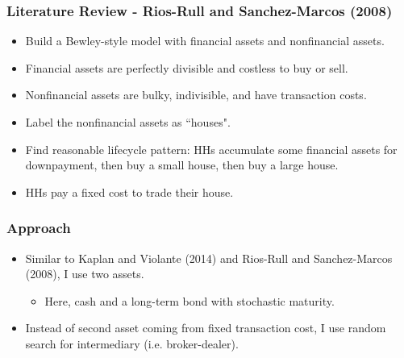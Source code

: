 \documentclass[handout]{beamer}
\begin{document}
\begin{frame}
\frametitle{Literature Review - Rios-Rull and Sanchez-Marcos (2008)}

\begin{itemize}[<+->]
\item Build a Bewley-style model with financial assets and nonfinancial assets.
\bigskip
\item Financial assets are perfectly divisible and costless to buy or sell.
\bigskip
\item Nonfinancial assets are bulky, indivisible, and have transaction costs.
\bigskip
\item Label the nonfinancial assets as ``houses".
\bigskip
\item Find reasonable lifecycle pattern: HHs accumulate some financial assets for downpayment, then buy a small house, then buy a large house.
\bigskip
\item HHs pay a fixed cost to trade their house.
\end{itemize}

\end{frame}




\begin{frame}
\frametitle{Approach}

\begin{itemize}[<+->]
\item Similar to Kaplan and Violante (2014) and Rios-Rull and Sanchez-Marcos (2008), I use two assets. 
\bigskip

\begin{itemize}[<+->]
\item Here, cash and a long-term bond with stochastic maturity.
\end{itemize}

\bigskip
\item Instead of second asset coming from fixed transaction cost, I use random search for intermediary (i.e. broker-dealer).
\end{itemize}

\end{frame}
\end{document}

